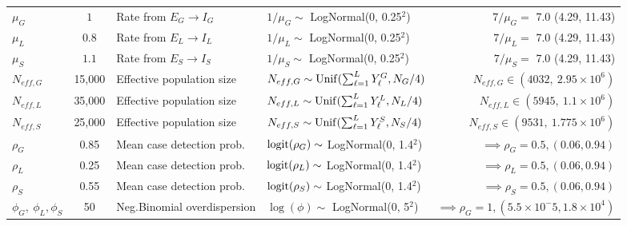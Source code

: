 \begin{table}
\begin{fullpage}
\begin{tabular}{lcllr}
		$ \mu_G $ & $ 1 $ & Rate from $ E_G\rightarrow I_G $ & $ 1/\mu_G\sim $ LogNormal(0, 0.25$ ^2 $) & $ 7/\mu_G = $ 7.0 (4.29, 11.43) \\
		$ \mu_L $ & $ 0.8 $ & Rate from $ E_L\rightarrow I_L $ & $ 1/\mu_L\sim $ LogNormal(0, 0.25$ ^2 $) & $ 7/\mu_L = $ 7.0 (4.29, 11.43) \\
		$ \mu_S $ & $ 1.1 $ & Rate from $ E_S\rightarrow I_S $ & $ 1/\mu_S\sim $ LogNormal(0, 0.25$ ^2 $) & $ 7/\mu_S = $ 7.0 (4.29, 11.43) \\
		$ N_{eff,G} $ & 15,000 & Effective population size & $ N_{eff,G}\sim\mathrm{Unif}(\sum_{\ell=1}^{L}Y_\ell^G, N_G/4) $& $ N_{eff,G} \in (4032,\ 2.95\times10^6) $ \\
		$ N_{eff,L} $ & 35,000 & Effective population size & $ N_{eff,L}\sim\mathrm{Unif}(\sum_{\ell=1}^{L}Y_\ell^L, N_L/4) $& $ N_{eff,L} \in (5945,\ 1.1\times10^6) $ \\
		$ N_{eff,S} $ & 25,000 & Effective population size & $ N_{eff,S}\sim\mathrm{Unif}(\sum_{\ell=1}^{L}Y_\ell^S, N_S/4) $& $ N_{eff,S} \in (9531,\ 1.775\times10^6) $ \\
		$ \rho_G $ & 0.85 & Mean case detection prob. & $ \mathrm{logit}(\rho_G) \sim $ LogNormal(0, 1.4$ ^2 $) & $ \implies \rho_G = 0.5, (0.06, 0.94)$ \\
		$ \rho_L $ & 0.25 & Mean case detection prob. & $ \mathrm{logit}(\rho_L) \sim $ LogNormal(0, 1.4$ ^2 $) & $ \implies \rho_L = 0.5, (0.06, 0.94)$ \\
		$ \rho_S $ & 0.55 & Mean case detection prob. & $ \mathrm{logit}(\rho_S) \sim $ LogNormal(0, 1.4$ ^2 $) & $ \implies \rho_S = 0.5, (0.06, 0.94)$ \\
		$ \phi_G,\ \phi_L, \phi_S $ & 50 & Neg.Binomial overdispersion & $ \log(\phi) \sim $ LogNormal(0, 5$ ^2 $) & $ \implies \rho_G = 1, (5.5\times 10^-5, 1.8\times10^4)$ \\
		\hline
	\end{tabular}
	\end{fullpage}
\end{table}

